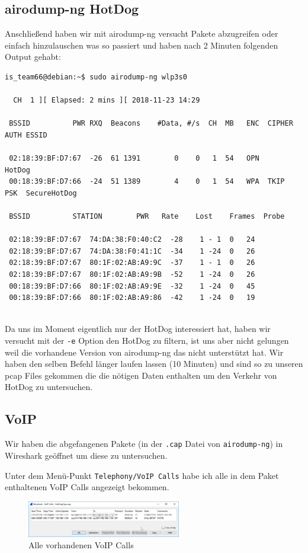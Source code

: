 \documentclass[12pt,a4paper,titlepage,oneside]{scrartcl}
\begin{document}
\subsection{airodump-ng HotDog}
Anschließend haben wir mit airodump-ng versucht Pakete abzugreifen oder einfach hinzulauschen was so passiert und haben nach 2 Minuten folgenden Output gehabt:

\begin{lstlisting}
is_team66@debian:~$ sudo airodump-ng wlp3s0

  CH  1 ][ Elapsed: 2 mins ][ 2018-11-23 14:29

 BSSID		    PWR RXQ  Beacons	#Data, #/s  CH	MB   ENC  CIPHER AUTH ESSID

 02:18:39:BF:D7:67  -26  61	1391	    0	 0   1	54   OPN	      HotDog
 00:18:39:BF:D7:66  -24  51	1389	    4	 0   1	54   WPA  TKIP	 PSK  SecureHotDog

 BSSID		    STATION	       PWR   Rate    Lost    Frames  Probe

 02:18:39:BF:D7:67  74:DA:38:F0:40:C2  -28    1 - 1	 0	 24
 02:18:39:BF:D7:67  74:DA:38:F0:41:1C  -34    1 -24	 0	 26
 02:18:39:BF:D7:67  80:1F:02:AB:A9:9C  -37    1 - 1	 0	 26
 02:18:39:BF:D7:67  80:1F:02:AB:A9:9B  -52    1 -24	 0	 26
 00:18:39:BF:D7:66  80:1F:02:AB:A9:9E  -32    1 -24	 0	 45
 00:18:39:BF:D7:66  80:1F:02:AB:A9:86  -42    1 -24	 0	 19
 
\end{lstlisting}

Da uns im Moment eigentlich nur der HotDog interessiert hat, haben wir versucht mit der \lstinline{-e} Option den HotDog zu filtern, ist uns aber nicht gelungen weil die vorhandene Version von airodump-ng das nicht unterstützt hat.
Wir haben den selben Befehl länger laufen lassen (10 Minuten) und sind so zu unseren pcap Files gekommen die die nötigen Daten enthalten um den Verkehr von HotDog zu untersuchen.

\subsection{VoIP}

Wir haben die abgefangenen Pakete (in der \lstinline{.cap} Datei von \lstinline{airodump-ng}) in Wireshark geöffnet um diese zu untersuchen.

Unter dem Menü-Punkt \lstinline{Telephony/VoIP Calls} habe ich alle in dem Paket enthaltenen VoIP Calls angezeigt bekommen.

\begin{figure}[h!]
  \centering
    \includegraphics[width=0.6\textwidth]{./imgs/intranet_screenshots/ws_voipcalls_wnd.png}
  \caption{Alle vorhandenen VoIP Calls}
  \label{fig:allvoipcalls}
\end{figure}
\end{document}
